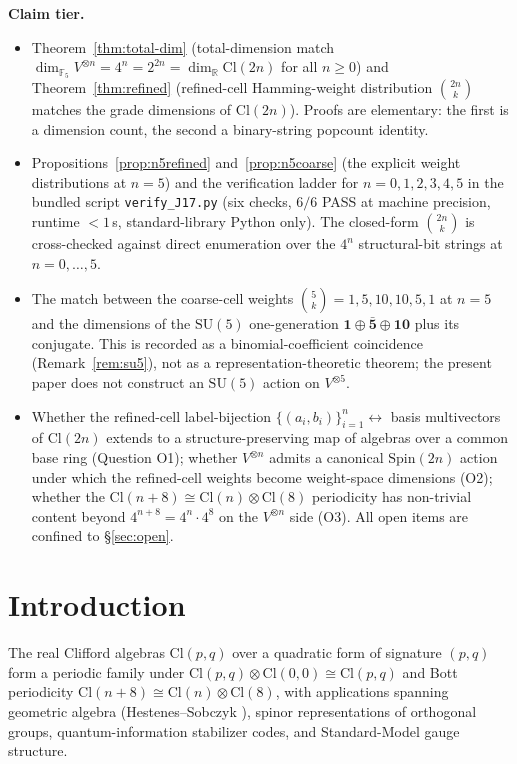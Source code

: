 \documentclass[11pt,reqno]{amsart}
\theoremstyle{plain}
\theoremstyle{definition}
\theoremstyle{remark}
\newcommand{\F}{\mathbb{F}}
\newcommand{\R}{\mathbb{R}}
\newcommand{\Cl}{\mathrm{Cl}}
\begin{document}
\medskip
\noindent\textbf{Claim tier.}
\begin{itemize}
\item[\textbf{PROVED.}]
Theorem~\ref{thm:total-dim} (total-dimension match
$\dim_{\F_5} V^{\otimes n} = 4^n = 2^{2n} = \dim_\R \Cl(2n)$ for all
$n \geq 0$) and Theorem~\ref{thm:refined} (refined-cell Hamming-weight
distribution $\binom{2n}{k}$ matches the grade dimensions of $\Cl(2n)$).
Proofs are elementary: the first is a dimension count, the second a
binary-string popcount identity.
\item[\textbf{COMPUTED.}]
Propositions~\ref{prop:n5refined} and~\ref{prop:n5coarse} (the explicit
weight distributions at $n = 5$) and the verification ladder for
$n = 0, 1, 2, 3, 4, 5$ in the bundled script \texttt{verify\_J17.py}
(six checks, $6/6$ PASS at machine precision, runtime $< 1$\,s,
standard-library Python only). The closed-form $\binom{2n}{k}$ is
cross-checked against direct enumeration over the $4^n$ structural-bit
strings at $n = 0, \ldots, 5$.
\item[\textbf{STRUCTURAL RHYME.}]
The match between the coarse-cell weights $\binom{5}{k} =
1, 5, 10, 10, 5, 1$ at $n=5$ and the dimensions of the $\mathrm{SU}(5)$
one-generation $\mathbf{1} \oplus \bar{\mathbf{5}} \oplus \mathbf{10}$
plus its conjugate.  This is recorded as a binomial-coefficient
coincidence (Remark~\ref{rem:su5}), not as a representation-theoretic
theorem; the present paper does not construct an $\mathrm{SU}(5)$
action on $V^{\otimes 5}$.
\item[\textbf{OPEN.}]
Whether the refined-cell label-bijection
$\{(a_i, b_i)\}_{i=1}^n \leftrightarrow$ basis multivectors of $\Cl(2n)$
extends to a structure-preserving map of algebras over a common base
ring (Question O1); whether $V^{\otimes n}$ admits a canonical
$\mathrm{Spin}(2n)$ action under which the refined-cell weights become
weight-space dimensions (O2); whether the $\Cl(n+8) \cong \Cl(n)
\otimes \Cl(8)$ periodicity has non-trivial content beyond
$4^{n+8} = 4^n \cdot 4^8$ on the $V^{\otimes n}$ side (O3). All open
items are confined to \S\ref{sec:open}.
\end{itemize}

\section{Introduction}

The real Clifford algebras $\Cl(p, q)$ over a quadratic form of
signature $(p, q)$ form a periodic family under
$\Cl(p, q) \otimes \Cl(0, 0) \cong \Cl(p, q)$ and Bott periodicity
$\Cl(n + 8) \cong \Cl(n) \otimes \Cl(8)$, with applications spanning
geometric algebra (Hestenes--Sobczyk \cite{HesteneSobczyk1984}),
spinor representations of orthogonal groups, quantum-information
stabilizer codes, and Standard-Model gauge structure.
\end{document}
